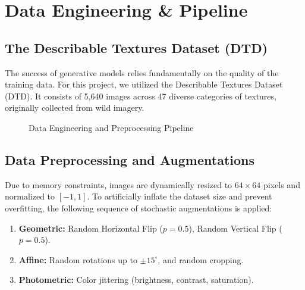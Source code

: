 \documentclass[12pt,a4paper]{article}
\begin{document}
\section{Data Engineering \& Pipeline}

\subsection{The Describable Textures Dataset (DTD)}
The success of generative models relies fundamentally on the quality of the training data. For this project, we utilized the Describable Textures Dataset (DTD). It consists of 5,640 images across 47 diverse categories of textures, originally collected from wild imagery.

\begin{figure}[H]
\centering
{}
\caption{Data Engineering and Preprocessing Pipeline}
\label{fig:data_pipeline}
\end{figure}

\subsection{Data Preprocessing and Augmentations}
Due to memory constraints, images are dynamically resized to $64 \times 64$ pixels and normalized to $[-1, 1]$. To artificially inflate the dataset size and prevent overfitting, the following sequence of stochastic augmentations is applied:
\begin{enumerate}
    \item \textbf{Geometric:} Random Horizontal Flip ($p=0.5$), Random Vertical Flip ($p=0.5$).
    \item \textbf{Affine:} Random rotations up to $\pm 15^\circ$, and random cropping.
    \item \textbf{Photometric:} Color jittering (brightness, contrast, saturation).
\end{enumerate}
\end{document}
